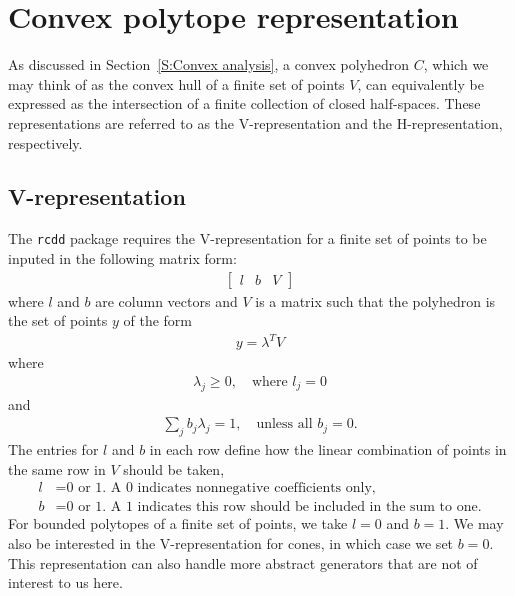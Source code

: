 \section{Convex polytope representation}
As discussed in Section~\ref{S:Convex analysis}, a convex polyhedron $C$, which we 
may think of as the convex hull of a finite set of points $V$, can equivalently
be expressed as the intersection of a finite collection of closed half-spaces.  These
representations are referred to as the V-representation and the H-representation, 
respectively.

\subsection{V-representation} \label{S:V-rep}
The \texttt{rcdd} package requires the V-representation for a finite set of points 
to be inputed in the following matrix form:
\begin{align} \label{E:V-rep}
	\left[\begin{array}{ccc}l & b & V\end{array}\right]
\end{align}
where $l$ and $b$ are column vectors and $V$ is a matrix such that the polyhedron
is the set of points $y$ of the form
\begin{align*}
	y = \lambda^T V
\end{align*}
where
\begin{align*}
	\lambda_j \geq 0, \quad \text{where $l_j = 0$}
\end{align*}
and 
\begin{align*}
	\sum_j b_j \lambda_j = 1, \quad \text{unless all $b_j = 0$.}
\end{align*}
The entries for $l$ and $b$ in each row define how the linear combination of 
points in the same row in $V$ should be taken,
\begin{align*}
	l &= \text{0 or 1.  A 0 indicates nonnegative coefficients only,}\\
	b &= \text{0 or 1.  A 1 indicates this row should be included in the sum to one.}
\end{align*}
For bounded polytopes of a finite set of points, we take $l = 0$ and $b = 1$.  
We may also be interested in the V-representation for cones, in 
which case we set $b=0$.  
This representation can also handle more abstract generators that 
are not of interest to us here.

